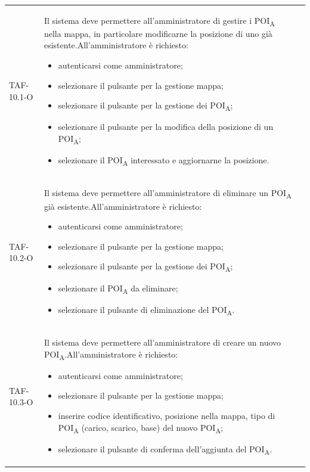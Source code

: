 \begin{longtable}{ >{\centering}p{} >{}p{}
		>{\centering}p{}}
	TAF-10.1-O & Il sistema deve permettere all'amministratore di gestire i POI\textsubscript{A} nella mappa, in particolare modificarne la posizione di uno già esistente.\newline All'amministratore è richiesto: \begin{itemize}\item autenticarsi come amministratore; \item selezionare il pulsante per la gestione mappa; \item selezionare il pulsante per la gestione dei POI\textsubscript{A}; \item selezionare il pulsante per la modifica della posizione di un POI\textsubscript{A}; \item selezionare il POI\textsubscript{A} interessato e aggiornarne la posizione.\end{itemize} & 0\tabularnewline

	TAF-10.2-O & Il sistema deve permettere all'amministratore di eliminare un POI\textsubscript{A} già esistente.\newline All'amministratore è richiesto: \begin{itemize}\item autenticarsi come amministratore; \item selezionare il pulsante per la gestione mappa; \item selezionare il pulsante per la gestione dei POI\textsubscript{A}; \item selezionare il POI\textsubscript{A} da eliminare; \item selezionare il pulsante di eliminazione del POI\textsubscript{A}.\end{itemize} & 0\tabularnewline

	TAF-10.3-O & Il sistema deve permettere all'amministratore di creare un nuovo POI\textsubscript{A}.\newline All'amministratore è richiesto: \begin{itemize}\item autenticarsi come amministratore; \item selezionare il pulsante per la gestione mappa; \item inserire codice identificativo, posizione nella mappa, tipo di POI\textsubscript{A} (carico, scarico, base) del nuovo POI\textsubscript{A}; \item selezionare il pulsante di conferma dell'aggiunta del POI\textsubscript{A}.\end{itemize} & 0\tabularnewline


\end{longtable}
